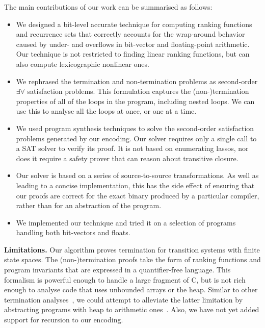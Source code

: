 \documentclass[preprint]{sigplanconf}
\theoremstyle{definition}
\begin{document}
The main contributions of our work can be summarised as follows:
%
\begin{itemize}

\item We designed a bit-level accurate technique for computing ranking
functions and recurrence sets that correctly accounts for the wrap-around
behavior caused by under- and overflows in bit-vector and floating-point arithmetic.  Our
technique is not restricted to finding linear ranking functions, but can
also compute lexicographic nonlinear ones.

\item  We rephrased the termination and non-termination problems as
second-order $\exists \forall$ satisfaction problems.  This formulation
captures the (non-)termination
properties of all of the loops in the program, including
nested loops.  We can use this to analyse all the loops at once,
or one at a time.

\item We used program synthesis techniques to solve the second-order satisfaction
problems generated by our encoding.  Our solver requires only a single call to a SAT solver to verify its
proof.  It is not based on enumerating lassos, nor does it require a safety prover
that can reason about transitive closure.

\item Our solver is based on a series of source-to-source
transformations.  As well as leading to a concise implementation, this has
the side effect of ensuring that our proofs are correct for the exact binary
produced by a particular compiler, rather than for an abstraction of the
program.

\item We implemented our technique and tried it on a selection of programs
handling both bit-vectors and floats.

\end{itemize} 

{\bf Limitations.} Our algorithm proves termination for transition systems
with finite state spaces.  The (non-)termination proofs take the form of
ranking functions and program invariants that are expressed in a
quantifier-free language.  This formalism is powerful enough to handle a
large fragment of C, but is not rich enough to analyse code that uses
unbounded arrays or the heap.  Similar to other termination
analyses~\cite{DBLP:conf/tacas/CookSZ13}, we could attempt to alleviate the
latter limitation by abstracting programs with heap to arithmetic
ones~\cite{DBLP:conf/popl/MagillTLT10}.  Also, we have not yet added support
for recursion to our encoding.
\end{document}
